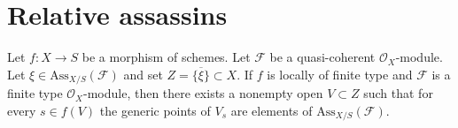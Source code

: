 \section{Relative assassins}
\label{section-assassin}

\begin{lemma}
\label{lemma-relative-assassin-in-neighbourhood}
Let $f : X \to S$ be a morphism of schemes.
Let $\mathcal{F}$ be a quasi-coherent $\mathcal{O}_X$-module.
Let $\xi \in \text{Ass}_{X/S}(\mathcal{F})$ and set
$Z = \overline{\{\xi\}} \subset X$.
If $f$ is locally of finite type and $\mathcal{F}$ is a
finite type $\mathcal{O}_X$-module, then there exists a nonempty
open $V \subset Z$ such that for every $s \in f(V)$ the generic
points of $V_s$ are elements of $\text{Ass}_{X/S}(\mathcal{F})$.
\end{lemma}

